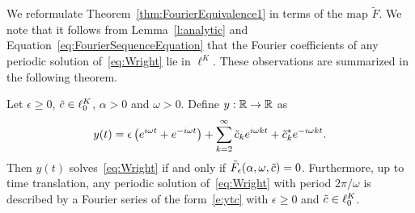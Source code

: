 We reformulate Theorem~\ref{thm:FourierEquivalence1}  in terms of the map  $\tilde{F}$. 
We note that it follows from Lemma~\ref{l:analytic} and 
Equation~\eqref{eq:FourierSequenceEquation}  
that the Fourier coefficients of any periodic solution of~\eqref{eq:Wright} lie in $\ell^K$.
These observations are summarized in the following theorem.
\begin{theorem}
\label{thm:FourierEquivalence2}
	Let $ \epsilon \geq 0$,  $\tilde{c} \in \ell^K_0$, $\alpha>0$ and $ \omega >0$. 
	Define $y: \mathbb{R}\to \mathbb{R}$ as 
\begin{equation}\label{e:ytc}
	y(t) = 
	\epsilon \left( e^{i \omega t }  + e^{- i \omega t }\right) 
	+  \sum_{k = 2}^\infty   \tilde{c}_k e^{i \omega k t }  + \tilde{c}_k^* e^{- i \omega k t } .
\end{equation}
	Then $y(t)$ solves~\eqref{eq:Wright} if and only if $\tilde{F}_{\epsilon}( \alpha , \omega , \tilde{c}) = 0$. 
	Furthermore, up to time translation, any periodic solution of~\eqref{eq:Wright} with period $2\pi/\omega$ is described by a Fourier series of the form~\eqref{e:ytc} with $\epsilon \geq 0$ and $\tilde{c} \in \ell^K_0$.
\end{theorem}








